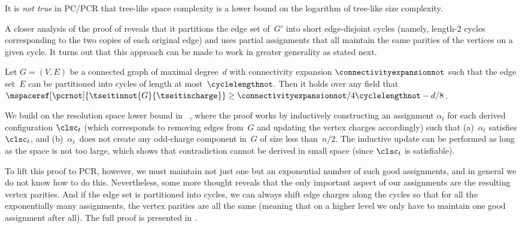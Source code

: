 \documentclass{toc}
\begin{document}
\begin{corollary}
  \label{cor:no-space-leq-log-length-bounf}
  It is \emph{not true} in PC/PCR
  that tree-like space complexity is %
  a lower bound on 
  the logarithm of tree-like size complexity.
\end{corollary}

\label{sec:tseitin-overview}

A closer analysis of the proof of
reveals that it partitions the edge set of~$G'$
into %
short  %
edge-disjoint cycles (namely, \mbox{length-$2$} cycles 
corresponding to the two copies of each original
edge) and uses partial assignments
%
that all maintain the same parities of the vertices on a given
cycle. It turns out that this approach can be made to work in
greater generality as stated next.

\begin{theorem}
  \label{th:tseitin-small-cycles-space-lower-bound}
  Let $G = (V,E)$ be a
  connected
  graph of %
  maximal degree~$d$  %
  with connectivity expansion $\connectivityexpansionnot$ such that 
  the edge set~$E$ can be partitioned into
  cycles of length at most~$\cyclelengthnot$.
  Then it holds over any field that
  $
  \mspaceref[\pcrnot]{\tseitinnot{G}{\tseitincharge}}\geq
  \connectivityexpansionnot/4\cyclelengthnot -d/8 
  $.
\end{theorem}

\begin{ourproof}[sketch]
%
%
  We build on the
  resolution space lower bound in~%
  \mbox{\cite{ABRW02SpaceComplexity,ET01SpaceBounds},}
  where the proof works by inductively constructing an assignment
  $\alpha_t$ for
  each derived configuration $\clsc_t$
  (which corresponds to removing edges 
  from~$G$
%
  and updating the vertex
  charges accordingly) such that
  (a)~$\alpha_t$ satisfies $\clsc_t$, and  
  (b)~$\alpha_t$~does not create any odd-charge component in~$G$ of 
  size less than~$n/2$.
  The inductive update 
  can be performed 
%
  as long as the space is not too large,
  which shows that contradiction cannot be derived in small space
  (since $\clsc_t$ is satisfiable).

  To lift this proof to PCR, however, 
%
  we must maintain not just one but an exponential number of such good
  assignments, and in general we do not know how to do this.
  Nevertheless, some more thought reveals that the only important
  aspect of our assignments are the resulting vertex parities.
  And if the edge set is partitioned into cycles, we can always shift
  edge charges along the cycles so that for all the exponentially many
  assignments,  
  the vertex parities
  are all the same (meaning 
  that on a higher level
  we only have to maintain one good assignment after  all). 
%
  The full proof is presented in .
\end{ourproof}
\end{document}
